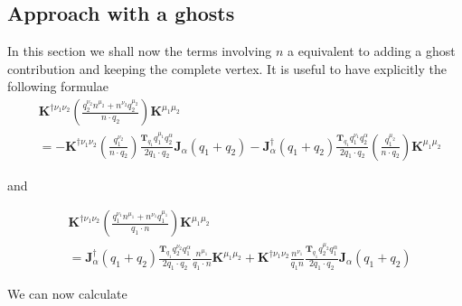\documentclass[a4paper,11pt]{article}
\numberwithin{equation}{section}
\newcommand{\ldot}{\!\cdot\!}
\newcommand{\bd}[1]{\mathbf{#1}}
\begin{document}
\subsection{Approach with a ghosts}
In this section we shall now the terms involving $n$  a equivalent to adding a ghost contribution and keeping the complete 
vertex.  It is useful to have explicitly the following formulae
\begin{align*}
 &\bd{K}^{\dagger\nu_1\nu_2} 
  \left( 
\frac{q_2^{\nu_2}n^{\mu_2}+ n^{\nu_2}q_2^{\mu_2}}{n\cdot q_2}
 \right) 
 \bd{K}^{\mu_1\mu_2}\\
%
&= -  \bd{K}^{\dagger\nu_1\nu_2} 
  \left( 
\frac{q_1^{\nu_2}}{n\cdot q_2}
 \right) 
 \frac{ \bd{T}_{q_1} q_1^{\mu_1} q_2^\alpha}{2q_1\ldot q_2}  \bd{J}_\alpha(q_1+q_2)
-
\bd{J}^\dagger_\alpha(q_1+q_2)  \frac{ \bd{T}_{q_1} q_1^{\nu_1} q_2^\alpha}{2q_1\ldot q_2}  
  \left( 
\frac{q_1^{\mu_2}}{n\cdot q_2}
 \right) 
 \bd{K}^{\mu_1\mu_2}
\end{align*}

and

\begin{align*}
 &\bd{K}^{\dagger\nu_1\nu_2} 
 \left( 
 \frac{q_1^{\nu_1}n^{\mu_1}+ n^{\nu_1}q_1^{\mu_1}}{q_1\cdot n}
 \right) 
 \bd{K}^{\mu_1\mu_2}\\
%
&=
 \bd{J}^\dagger_\alpha(q_1+q_2)    \frac{ \bd{T}_{q_1} q_2^{\nu_2} q_1^\alpha}{2q_1\ldot q_2} 
 \frac{n^{\mu_1}}{q_1\cdot n} \bd{K}^{\mu_1\mu_2}
+
\bd{K}^{\dagger\nu_1\nu_2} 
 \frac{n^{\nu_1}}{q_1n}
 \frac{ \bd{T}_{q_1} q_2^{\mu_2} q_1^\alpha}{2q_1\ldot q_2}  \bd{J}_\alpha(q_1+q_2)
\end{align*}

We can now calculate
\end{document}
